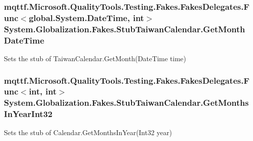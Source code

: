 \hypertarget{class_system_1_1_globalization_1_1_fakes_1_1_stub_taiwan_calendar_a2a4e7d067dc9aacf9420fc41d0b61fee}{
\subsubsection[{Get\-Month\-Date\-Time}]{\setlength{\rightskip}{0pt plus 5cm}mqttf.\-Microsoft.\-Quality\-Tools.\-Testing.\-Fakes.\-Fakes\-Delegates.\-Func$<$global.\-System.\-Date\-Time, int$>$ System.\-Globalization.\-Fakes.\-Stub\-Taiwan\-Calendar.\-Get\-Month\-Date\-Time}}\label{class_system_1_1_globalization_1_1_fakes_1_1_stub_taiwan_calendar_a2a4e7d067dc9aacf9420fc41d0b61fee}


Sets the stub of Taiwan\-Calendar.\-Get\-Month(\-Date\-Time time)

\hypertarget{class_system_1_1_globalization_1_1_fakes_1_1_stub_taiwan_calendar_a9468cfc7f332e5103d536adaab33858d}{
\subsubsection[{Get\-Months\-In\-Year\-Int32}]{\setlength{\rightskip}{0pt plus 5cm}mqttf.\-Microsoft.\-Quality\-Tools.\-Testing.\-Fakes.\-Fakes\-Delegates.\-Func$<$int, int$>$ System.\-Globalization.\-Fakes.\-Stub\-Taiwan\-Calendar.\-Get\-Months\-In\-Year\-Int32}}\label{class_system_1_1_globalization_1_1_fakes_1_1_stub_taiwan_calendar_a9468cfc7f332e5103d536adaab33858d}


Sets the stub of Calendar.\-Get\-Months\-In\-Year(\-Int32 year)

